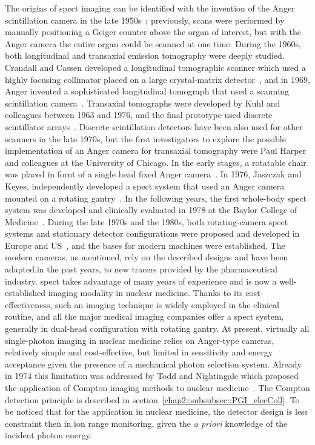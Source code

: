 The origins of \gls{spect} imaging can be identified with the invention of the Anger scintillation camera in the late 1950s~\parencite{Anger1958, Anger1964}; previously, scans were performed by manually positioning a Geiger counter above the organ of interest, but with the Anger camera the entire organ could be scanned at one time. During the 1960s, both longitudinal and transaxial emission tomography were deeply studied. Crandall and Cassen developed a longitudinal tomographic scanner which used a highly focusing collimator placed on a large crystal-matrix detector~\parencite{Crandall1966}, and in 1969, Anger invented a sophisticated longitudinal tomograph that used a scanning scintillation camera~\parencite{Anger1969}. Transaxial tomographs were developed by Kuhl and colleagues between 1963 and 1976, and the final prototype used discrete scintillator arrays~\parencite{Kuhl1976}. Discrete scintillation detectors have been also used for other scanners in the late 1970s, but the first investigators to explore the possible implementation of an Anger camera for transaxial tomography were Paul Harper and colleagues at the University of Chicago. In the early stages, a rotatable chair was placed in fornt of a single head fixed Anger camera~\parencite{Muehllehner1971}. In 1976, Jaszczak and Keyes, independently developed a \gls{spect} system that used an Anger camera mounted on a rotating gantry~\parencite{Jaszczak1977, Keyes1977}. In the following years, the first whole-body \gls{spect} system was developed and clinically evaluated in 1978 at the Baylor College of Medicine~\parencite{Jaszczak1979}. During the late 1970s and the 1980s, both rotating-camera \gls{spect} systems and stationary detector configurations were proposed and developed in Europe and US~\parencite{Larsson1980, Rogers1988}, and the bases for modern machines were established. 
The modern cameras, as mentioned, rely on the described designs and have been adapted.in the past years, to new tracers provided by the pharmaceutical industry. \gls{spect} takes advantage of many years of experience and is now a well-established imaging modality in nuclear medicine. Thanks to its cost-effectiveness, such an imaging technique is widely employed in the clinical routine, and all the major medical imaging companies offer a \gls{spect} system, generally in dual-head configuration with rotating gantry.
At present, virtually all single-photon imaging in nuclear medicine relies on Anger-type cameras, relatively simple and cost-effective, but limited in sensitivity and energy acceptance given the presence of a mechanical photon selection system. Already in 1974 this limitation was addressed by Todd and Nightingale which proposed the application of Compton imaging methods to nuclear medicine~\parencite{Todd1974}. The Compton detection principle is described in section~\ref{chap2::subsubsec::PGI_elecColl}. To be noticed that for the application in nuclear medicine, the detector design is less constraint then in ion range monitoring, given the \textit{a priori} knowledge of the incident photon energy.

